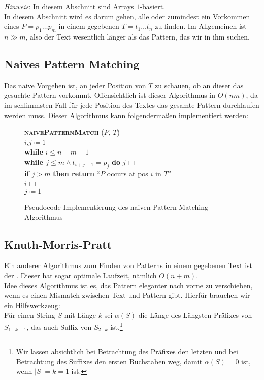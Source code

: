 \emph{Hinweis}: In diesem Abschnitt sind Arrays \( 1 \)-basiert. \\

In diesem Abschnitt wird es darum gehen, alle oder zumindest ein Vorkommen eines  \( P = p_1\dots p_m \) in einem gegebenen  \( T = t_1\dots t_n \) zu finden. Im Allgemeinen ist \( n \gg m \), also der Text wesentlich länger als das Pattern, das wir in ihm suchen. 

\subsection{Naives Pattern Matching}
Das naive Vorgehen ist, an jeder Position von \( T \) zu schauen, ob an dieser das gesuchte Pattern vorkommt. Offensichtlich ist dieser Algorithmus in \( O(nm) \), da im schlimmsten Fall für jede Position des Textes das gesamte Pattern durchlaufen werden muss. Dieser Algorithmus kann folgendermaßen implementiert werden:
\begin{figure}[H]
  \begin{pseudocode}
    \textbf{\textsc{naivePatternMatch}} (\( P \), \( T \)) \\
    \( i \),\( j \coloneqq 1 \) \\
    \textbf{while} \( i \leq n-m+1 \) \\
    \phantom{\enskip} \textbf{while \( j \leq m \wedge t_{i+j-1} = p_j \)} \textbf{do} \( j \)++ \\
    \phantom{\enskip} \textbf{if \( j > m \)} \textbf{then return} ``\( P \) occurs at pos \( i \) in \( T \)'' \\
    \phantom{\enskip} \( i \)++ \\
    \phantom{\enskip} \( j \coloneqq 1 \)
  \end{pseudocode}
  \caption{Pseudocode-Implementierung des naiven Pattern-Matching-Algorithmus}
\end{figure}

\subsection{Knuth-Morris-Pratt}
Ein anderer Algorithmus zum Finden von Patterns in einem gegebenen Text ist der \label{def:kmpAlgorithmus}. Dieser hat sogar optimale Laufzeit, nämlich \( O(n+m) \). \\
Idee dieses Algorithmus ist es, das Pattern eleganter nach vorne zu verschieben, wenn es einen Mismatch zwischen Text und Pattern gibt. Hierfür brauchen wir ein Hilfswerkzeug: \\
Für einen String \( S \) mit Länge \( k \) sei \( \alpha(S) \) die Länge des Längsten Präfixes von \( S_{1\dots k-1} \), das auch Suffix von \( S_{2\dots k} \) ist.\footnote{Wir lassen absichtlich bei Betrachtung des Präfixes den letzten und bei Betrachtung des Suffixes den ersten Buchstaben weg, damit \( \alpha(S) = 0 \) ist, wenn \( \left\vert S \right\vert = k = 1 \) ist.} 

